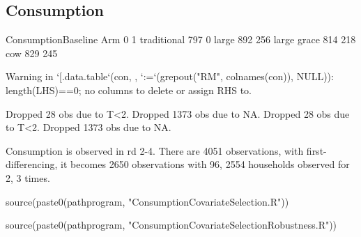 \subsection{Consumption}



\begin{Schunk}
\begin{Soutput}
             ConsumptionBaseline
Arm             0   1
  traditional 797   0
  large       892 256
  large grace 814 218
  cow         829 245
\end{Soutput}
\begin{Soutput}
Warning in `[.data.table`(con, , `:=`(grepout("RM", colnames(con)), NULL)): length(LHS)==0; no columns to delete or assign RHS to.
\end{Soutput}
\begin{Soutput}
Dropped 28 obs due to T<2.
Dropped 1373 obs due to NA.
Dropped 28 obs due to T<2.
Dropped 1373 obs due to NA.
\end{Soutput}
\end{Schunk}

Consumption is observed in rd 2-4. There are 4051 observations, with first-differencing, it becomes 2650 observations with 96, 2554 households observed for 2, 3 times. 


\begin{Schunk}
\begin{Sinput}
source(paste0(pathprogram, "ConsumptionCovariateSelection.R"))
\end{Sinput}
\end{Schunk}

\begin{Schunk}
\begin{Sinput}
source(paste0(pathprogram, "ConsumptionCovariateSelectionRobustness.R"))
\end{Sinput}
\end{Schunk}




